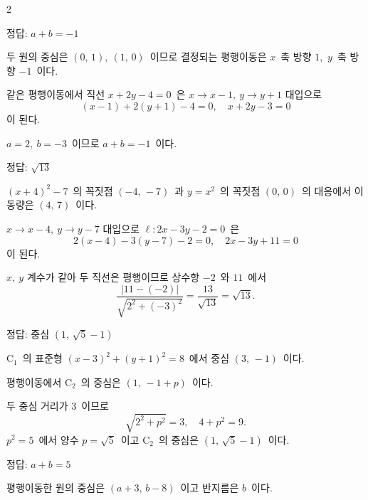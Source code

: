 \documentclass[10pt,fleqn]{article}
\begin{document}
\dmsoltitlefirsttrue
\begin{multicols*}{2}

\begin{dmanswerbox}
정답: $a+b=-1$
\end{dmanswerbox}

두 원의 중심은 $(0,\, 1),\ (1,\, 0)$\ 이므로 결정되는 평행이동은 $x$\ 축 방향 $1$,\ $y$\ 축 방향 $-1$\ 이다.

같은 평행이동에서 직선 $x + 2y - 4 = 0$\ 은 $x \to x - 1,\ y \to y + 1$ 대입으로
\[ (x - 1) + 2(y + 1) - 4 = 0,\quad x + 2y - 3 = 0 \]
이 된다.

$a = 2,\ b = -3$\ 이므로 $a + b = -1$\ 이다.

\begin{dmanswerbox}
정답: $\sqrt{13}$
\end{dmanswerbox}

$(x + 4)^2 - 7$\ 의 꼭짓점 $(-4,\, -7)$\ 과 $y = x^2$\ 의 꼭짓점 $(0,\, 0)$\ 의 대응에서 이동량은 $(4,\, 7)$\ 이다.

$x \to x - 4,\ y \to y - 7$ 대입으로 $\ell : 2x - 3y - 2 = 0$\ 은
\[ 2(x - 4) - 3(y - 7) - 2 = 0,\quad 2x - 3y + 11 = 0 \]
이 된다.

$x,\ y$ 계수가 같아 두 직선은 평행이므로 상수항 $-2$\ 와 $11$\ 에서
\[ \dfrac{|11 - (-2)|}{\sqrt{2^2 + (-3)^2}} = \dfrac{13}{\sqrt{13}} = \sqrt{13}. \]
\begin{dmanswerbox}
정답: 중심 $(1,\, \sqrt{5}-1)$
\end{dmanswerbox}

$\mathrm{C}_1$\ 의 표준형 $(x - 3)^2 + (y + 1)^2 = 8$\ 에서 중심 $(3,\, -1)$\ 이다.

평행이동에서 $\mathrm{C}_2$\ 의 중심은 $(1,\, -1 + p)$\ 이다.

두 중심 거리가 $3$\ 이므로
\[ \sqrt{2^2 + p^2} = 3,\quad 4 + p^2 = 9. \]
$p^2 = 5$\ 에서 양수 $p = \sqrt{5}$\ 이고 $\mathrm{C}_2$\ 의 중심은 $(1,\, \sqrt{5} - 1)$\ 이다.

\begin{dmanswerbox}
정답: $a+b=5$
\end{dmanswerbox}

평행이동한 원의 중심은 $(a + 3,\, b - 8)$\ 이고 반지름은 $b$\ 이다.


\end{multicols*}
\end{document}
